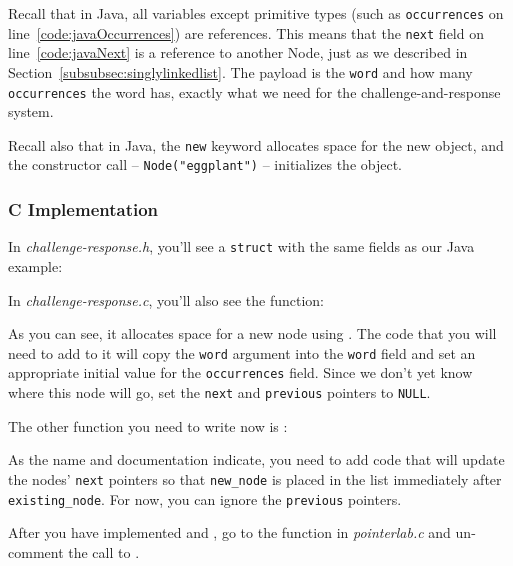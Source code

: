 Recall that in Java, all variables except primitive types (such as \lstinline{occurrences} on line~\ref{code:javaOccurrences}) are references.
This means that the \lstinline{next} field on line~\ref{code:javaNext} is a reference to another Node, just as we described in Section~\ref{subsubsec:singlylinkedlist}.
The payload is the \lstinline{word} and how many \lstinline{occurrences} the word has, exactly what we need for the challenge-and-response system.

Recall also that in Java, the \lstinline{new} keyword allocates space for the new object, and the constructor call -- \lstinline{Node("eggplant")} -- initializes the object.

\subsubsection{C Implementation}

In \textit{challenge-response.h}, you'll see a \lstinline{struct} with the same fields as our Java example:



In \textit{challenge-response.c}, you'll also see the  function:



As you can see, it allocates space for a new node using .
The code that you will need to add to it will copy the \lstinline{word} argument into the \lstinline{word} field and set an appropriate initial value for the \lstinline{occurrences} field.
Since we don't yet know where this node will go, set the \lstinline{next} and \lstinline{previous} pointers to \lstinline{NULL}.

The other function you need to write now is :



As the name and documentation indicate, you need to add code that will update the nodes' \lstinline{next} pointers so that \lstinline{new_node} is placed in the list immediately after \lstinline{existing_node}.
For now, you can ignore the \lstinline{previous} pointers.

After you have implemented  and , go to the  function in \textit{pointerlab.c} and un-comment the call to .

